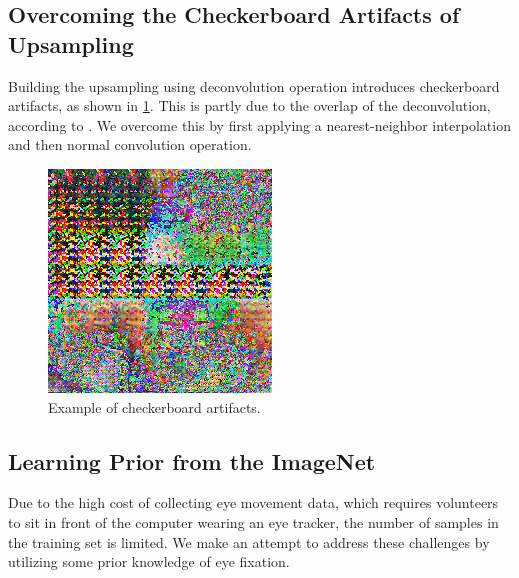 \documentclass[10pt,twocolumn,letterpaper]{article}
\begin{document}
\subsection{Overcoming the Checkerboard Artifacts of Upsampling}
Building the upsampling using deconvolution operation introduces checkerboard
artifacts, as shown in \ref{fig:checker}. This is partly due to the overlap of the
deconvolution, according to \cite{checkerboard}. We overcome this by first applying a nearest-neighbor interpolation and then normal convolution operation.

 \begin{figure}
	\begin{center}
		\includegraphics[width=0.4\columnwidth]{figures/checker.png}
	\end{center}
	\caption{Example of checkerboard artifacts.}
	\label{fig:checker}
\end{figure}
\subsection{Learning Prior from the ImageNet}

 Due to the high cost of collecting eye movement data, which requires
 volunteers to sit in front of the computer wearing an eye tracker, the number
 of samples in the training set is limited. We make an attempt to address these
 challenges by utilizing some prior knowledge of eye fixation.
 
\end{document}
